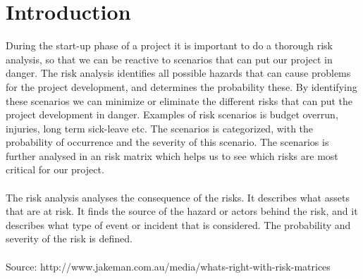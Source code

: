 \section{Introduction}
During the start-up phase of a project it is important to do a thorough risk analysis, so that we can be reactive to scenarios that can put our project in danger. The risk analysis identifies all possible hazards that can cause problems for the project development, and determines the probability these. By identifying these scenarios we can minimize or eliminate the different risks that can put the project development in danger. Examples of risk scenarios is budget overrun, injuries, long term sick-leave etc. The scenarios is categorized, with the probability of occurrence and the severity of this scenario. The scenarios is further analysed in an risk matrix which helps us to see which risks are most critical for our project. \\ \\
The risk analysis analyses the consequence of the risks. It describes what assets that are at risk. It finds the source of the hazard or actors behind the risk, and it describes what type of event or incident that is considered. The probability and severity of the risk is defined. 
\\ \\
Source: http://www.jakeman.com.au/media/whats-right-with-risk-matrices